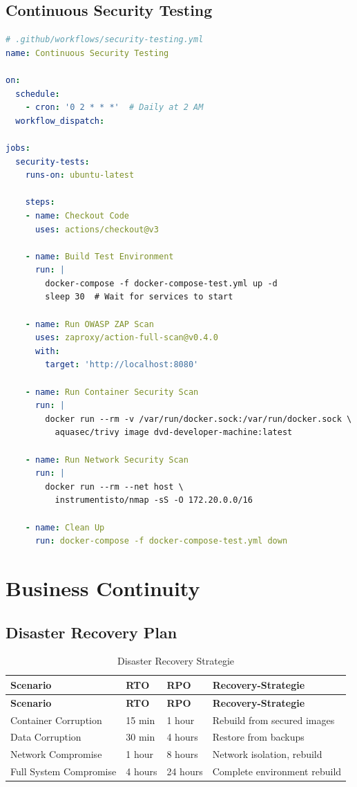 \documentclass[11pt,a4paper]{article}
\begin{document}
\subsection{Continuous Security Testing}

\begin{lstlisting}[language=yaml, caption=CI/CD Security Pipeline]
# .github/workflows/security-testing.yml
name: Continuous Security Testing

on:
  schedule:
    - cron: '0 2 * * *'  # Daily at 2 AM
  workflow_dispatch:

jobs:
  security-tests:
    runs-on: ubuntu-latest
    
    steps:
    - name: Checkout Code
      uses: actions/checkout@v3
      
    - name: Build Test Environment
      run: |
        docker-compose -f docker-compose-test.yml up -d
        sleep 30  # Wait for services to start
        
    - name: Run OWASP ZAP Scan
      uses: zaproxy/action-full-scan@v0.4.0
      with:
        target: 'http://localhost:8080'
        
    - name: Run Container Security Scan
      run: |
        docker run --rm -v /var/run/docker.sock:/var/run/docker.sock \
          aquasec/trivy image dvd-developer-machine:latest
          
    - name: Run Network Security Scan
      run: |
        docker run --rm --net host \
          instrumentisto/nmap -sS -O 172.20.0.0/16
          
    - name: Clean Up
      run: docker-compose -f docker-compose-test.yml down
\end{lstlisting}

\section{Business Continuity}

\subsection{Disaster Recovery Plan}

\begin{longtable}{|l|p{3cm}|p{3cm}|p{3cm}|}
\caption{Disaster Recovery Strategie} \\
\hline
\textbf{Scenario} & \textbf{RTO} & \textbf{RPO} & \textbf{Recovery-Strategie} \\
\hline
\endfirsthead
\hline
\textbf{Scenario} & \textbf{RTO} & \textbf{RPO} & \textbf{Recovery-Strategie} \\
\hline
\endhead
\hline
\endfoot
\hline
\endlastfoot

Container Corruption & 15 min & 1 hour & Rebuild from secured images \\
\hline
Data Corruption & 30 min & 4 hours & Restore from backups \\
\hline
Network Compromise & 1 hour & 8 hours & Network isolation, rebuild \\
\hline
Full System Compromise & 4 hours & 24 hours & Complete environment rebuild \\
\hline
\end{longtable}
\end{document}

